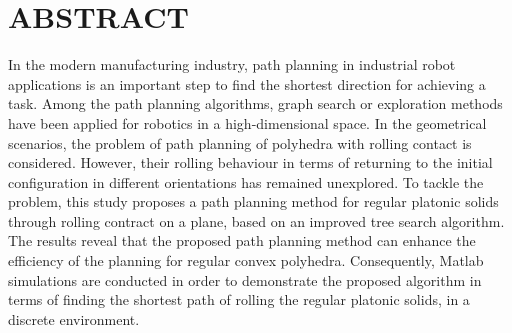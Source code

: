 
\noindent\section{ABSTRACT}
In the modern manufacturing industry, path planning in industrial robot applications is an important step to find the shortest direction for achieving a task. 
Among the path planning algorithms, graph search or exploration methods have been applied for robotics in a high-dimensional space. 
In the geometrical scenarios, the problem of path planning of polyhedra with rolling contact is considered. 
However, their rolling behaviour in terms of returning to the initial configuration in different orientations has remained unexplored. 
To tackle the problem, this study proposes a path planning method for regular platonic solids through rolling contract on a plane, based on an improved tree search algorithm.
The results reveal that the proposed path planning method can enhance the efficiency of the planning for regular convex polyhedra.
Consequently, Matlab simulations are conducted in order to demonstrate the proposed algorithm in terms of finding the shortest path of rolling the regular platonic solids, in a discrete environment.

